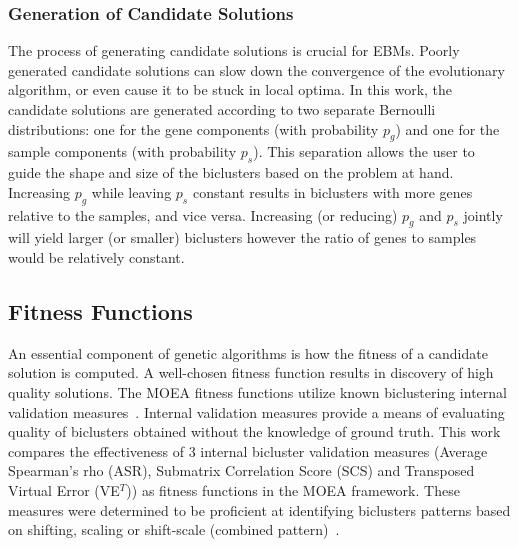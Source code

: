 \subsubsection*{Generation of Candidate Solutions}
The process of generating candidate solutions is crucial for EBMs. Poorly generated candidate solutions can slow down the convergence of the evolutionary algorithm, or even cause it to be stuck in local optima.
In this work, the candidate solutions are generated according to two separate Bernoulli distributions: one for the gene components (with probability $p_g$) and one for the sample components (with probability $p_s$).
This separation allows the user to guide the shape and size of the biclusters based on the problem at hand.
Increasing $p_g$ while leaving $p_s$ constant results in biclusters with more genes relative to the samples, and vice versa.
Increasing (or reducing) $p_g$ and $p_s$ jointly will yield larger (or smaller) biclusters however the ratio of genes to samples would be relatively constant.

\subsection{Fitness Functions}
An essential component of genetic algorithms is how the fitness of a candidate solution is computed. A well-chosen fitness function results in discovery of high quality solutions. 
The MOEA fitness functions utilize known biclustering internal validation measures~\cite{pontes2015quality}.
Internal validation measures provide a means of evaluating quality of biclusters obtained without the knowledge of ground truth. 
This work compares the effectiveness of 3 internal bicluster validation measures (Average Spearman's rho (ASR), Submatrix Correlation Score (SCS) and Transposed Virtual Error (VE$^T$)) as fitness functions in the MOEA framework. These measures were determined to be proficient at identifying biclusters patterns based on shifting, scaling or shift-scale (combined pattern)~\cite{pontes2015quality}.

